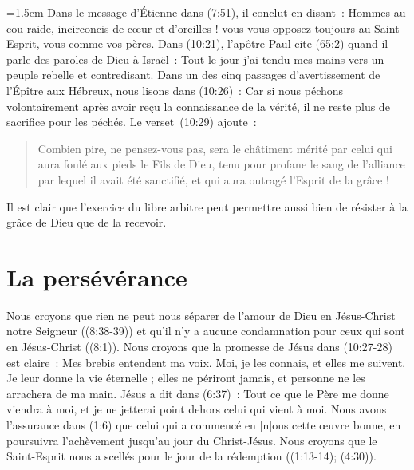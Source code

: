 \begin{digestpar}{}
\begin{pocketpar}{\emergencystretch=1.5em}
Dans le message d'Étienne dans
 (7:51), il conclut en disant~:
 \Og Hommes au cou raide, incirconcis de cœur et d'oreilles !
 vous vous opposez toujours au Saint-Esprit, vous comme vos pères. \Fg{}
 Dans (10:21),
 l'apôtre Paul cite (65:2)
 quand il parle des paroles de Dieu à Israël~:
 \Og Tout le jour j'ai tendu mes mains vers un peuple rebelle et contredisant. \Fg{}
 Dans un des cinq passages d'avertissement de l'Épître aux Hébreux,
 nous lisons dans (10:26)~:
 \Og Car si nous péchons volontairement après avoir reçu la connaissance de la vérité,
 il ne reste plus de sacrifice pour les péchés. \Fg{}
 Le verset~(10:29) ajoute~:
\end{pocketpar}
\end{digestpar}

\begin{quote}
\begin{digestpar}{}
\begin{pocketpar}{}
 \Og Combien pire, ne pensez-vous pas, sera le châtiment mérité par celui qui
 aura foulé aux pieds le Fils de Dieu, tenu pour profane le sang de l'alliance
 par lequel il avait été sanctifié, et qui aura outragé l'Esprit de la grâce ! \Fg{}
\end{pocketpar}
\end{digestpar}
\end{quote}

Il est clair que l'exercice du libre arbitre peut permettre aussi bien de résister
 à la grâce de Dieu que de la recevoir.

\section*{La persévérance}

\begin{digestpar}{}
Nous croyons que rien ne peut nous séparer de l'amour de Dieu en Jésus-Christ notre Seigneur
 ((8:38-39))
 et qu'il n'y a aucune condamnation pour ceux qui sont en Jésus-Christ
 ((8:1)).
 Nous croyons que la promesse de Jésus dans (10:27-28) est claire~:
 \Og Mes brebis entendent ma voix. Moi, je les connais, et elles me suivent.
 Je leur donne la vie éternelle ; elles ne périront jamais,
 et personne ne les arrachera de ma main. \Fg{}
 Jésus a dit dans (6:37)~:
 \Og Tout ce que le Père me donne viendra à moi,
 et je ne jetterai point dehors celui qui vient à moi. \Fg{}
 Nous avons l'assurance dans (1:6) \Og que celui qui a commencé
 en [n]ous cette œuvre bonne, en poursuivra l'achèvement jusqu'au jour
 du Christ-Jésus. \Fg{}
 Nous croyons que le Saint-Esprit nous a scellés
 pour le jour de la rédemption ((1:13-14);
 (4:30)).
\end{digestpar}

